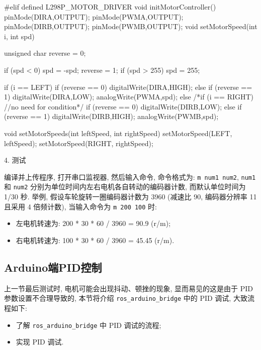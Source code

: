 \documentclass[openany, fontset=windowsold]{ctexbook}
\theoremstyle{kaiti}
\theoremstyle{normal}
\begin{document}
\begin{cpp}
  #elif defined L298P_MOTOR_DRIVER
    void initMotorController(){
      pinMode(DIRA,OUTPUT);
      pinMode(PWMA,OUTPUT);
      pinMode(DIRB,OUTPUT);
      pinMode(PWMB,OUTPUT);
    }
    void setMotorSpeed(int i, int spd){
      unsigned char reverse = 0;

      if (spd < 0)
      {
        spd = -spd;
        reverse = 1;
      }
      if (spd > 255)
        spd = 255;

      if (i == LEFT) { 
        if (reverse == 0) { 
          digitalWrite(DIRA,HIGH);
        } else if (reverse == 1) { 
          digitalWrite(DIRA,LOW);
        }
        analogWrite(PWMA,spd);
      } else /*if (i == RIGHT) //no need for condition*/ {
        if (reverse == 0) { 
          digitalWrite(DIRB,LOW);        
        } else if (reverse == 1) { 
          digitalWrite(DIRB,HIGH);
        }
        analogWrite(PWMB,spd);
      }
    }
    void setMotorSpeeds(int leftSpeed, int rightSpeed){
      setMotorSpeed(LEFT, leftSpeed);
      setMotorSpeed(RIGHT, rightSpeed);
    }
\end{cpp}

4. 测试

编译并上传程序, 打开串口监视器, 然后输入命令, 命令格式为: \verb|m num1 num2|, \verb|num1| 和 \verb|num2| 分别为单位时间内左右电机各自转动的编码器计数, 而默认单位时间为 1/30 秒. 举例, 假设车轮旋转一圈编码器计数为 3960 (减速比 90, 编码器分辨率 11 且采用 4 倍频计数), 当输入命令为 \verb|m 200 100| 时: 

\begin{itemize}
  \item 左电机转速为: 200 * 30 * 60 / 3960 = 90.9 (r/m);
  \item 右电机转速为: 100 * 30 * 60 / 3960 = 45.45 (r/m).
\end{itemize}


\subsection{Arduino端PID控制}

上一节最后测试时, 电机可能会出现抖动、顿挫的现象, 显而易见的这是由于 PID 参数设置不合理导致的, 本节将介绍 \verb|ros_arduino_bridge| 中的 PID 调试, 大致流程如下:

\begin{itemize}
  \item 了解 \verb|ros_arduino_bridge| 中 PID 调试的流程; 
  \item 实现 PID 调试.
\end{itemize}
\end{document}
